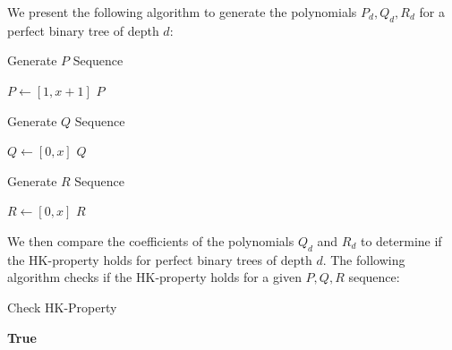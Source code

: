 \documentclass{amsart}
\theoremstyle{definition}
\begin{document}
\begin{appendix}
	We present the following algorithm to generate the polynomials $P_d, Q_d, R_d$ for a perfect binary tree of depth $d$:

	\begin{algorithm}[H]
		\caption{Generate $P$ Sequence}
		$P \gets [1, x+1]$\;
		\Return $P$
		\end{algorithm}

	\begin{algorithm}[H]
		\caption{Generate $Q$ Sequence}
		$Q \gets [0, x]$\;
		\Return $Q$
	\end{algorithm}

	\begin{algorithm}[H]
		\caption{Generate $R$ Sequence}
		$R \gets [0, x]$\;
		\Return $R$
	\end{algorithm}

	\vspace{1cm}
	We then compare the coefficients of the polynomials $Q_d$ and $R_d$ to determine if the HK-property holds for perfect binary trees of depth $d$. The following algorithm checks if the HK-property holds for a given $P, Q, R$ sequence:
	\newline

	\begin{algorithm}[H]
		\caption{Check HK-Property}
		\Return \textbf{True}
	\end{algorithm}

\end{appendix}

\newpage





\end{document}
